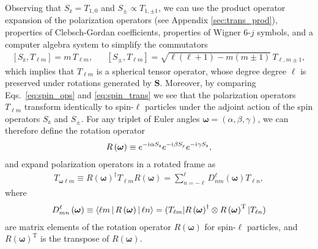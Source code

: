 \documentclass[notitlepage,twocolumn]{revtex4-2}
\renewcommand{\t}{\text} %
\newcommand{\p}[1]{\left(#1\right)} %
\renewcommand{\sp}[1]{\left[#1\right]} %
\newcommand{\bk}{\Braket} %
\renewcommand{\v}{\bm} %
\renewcommand{\i}{\mathrm{i}\mkern1mu} %
\newcommand{\y}{\text{y}}
\newcommand{\z}{\text{z}}
\def\obk#1{\mathinner{({#1})}}
\begin{document}
Observing that $S_\z=T_{1,0}$ and $S_\pm\propto T_{1,\pm1}$, we can use the product operator expansion of the polarization operators (see Appendix \ref{sec:trans_prod}), properties of Clebsch-Gordan coefficients, properties of Wigner $6$-$j$ symbols, and a computer algebra system to simplify the commutators
\begin{align}
  \sp{S_\z,T_{\ell m}} = m\, T_{\ell m},
  &&
  \sp{S_\pm,T_{\ell m}} = \sqrt{\ell\p{\ell+1}-m\p{m\pm 1}}\, T_{\ell,m\pm1},
  \label{eq:spin_trans}
\end{align}
which implies that $T_{\ell m}$ is a spherical tensor operator, whose degree degree $\ell$ is preserved under rotations generated by $\v S$.
Moreover, by comparing Eqs.~\eqref{eq:spin_ops} and \eqref{eq:spin_trans} we see that the polarization operators $T_{\ell m}$ transform identically to spin-$\ell$ particles under the adjoint action of the spin operators $S_\z$ and $S_\pm$.
For any triplet of Euler angles $\v\omega=\p{\alpha,\beta,\gamma}$, we can therefore define the rotation operator
\begin{align}
  R\p{\v\omega} \equiv
  e^{-\i\alpha S_\z} e^{-\i\beta S_\y} e^{-\i\gamma S_\z},
\end{align}
and expand polarization operators in a rotated frame as
\begin{align}
  T_{\v\omega\ell m}
  \equiv R\p{\v\omega}^\dag T_{\ell m} R\p{\v\omega}
  = \sum_{n=-\ell}^\ell D_{nm}^\ell\p{\v\omega} T_{\ell n},
  \label{eq:trans_rot_apndx}
\end{align}
where
\begin{align}
  D_{mn}^\ell\p{\v\omega} \equiv \bk{\ell m|R\p{\v\omega}|\ell n}
  = \obk{T_{\ell m} | R\p{\v\omega}^\dag
    \otimes R\p{\v\omega}^{\t{T}} |T_{\ell n}}
\end{align}
are matrix elements of the rotation operator $R\p{\v\omega}$ for spin-$\ell$ particles, and $R\p{\v\omega}^{\t{T}}$ is the transpose of $R\p{\v\omega}$.
\end{document}
